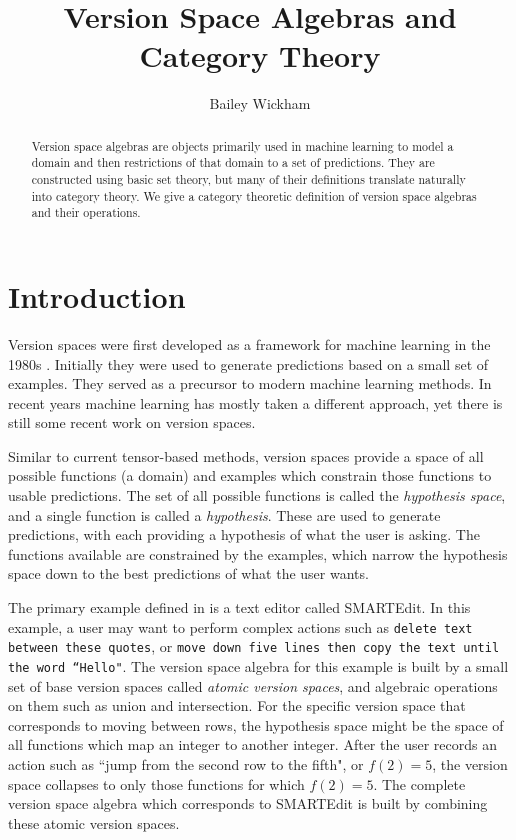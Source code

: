 \documentclass{article}
\title{Version Space Algebras and Category Theory}
\author{Bailey Wickham}
\theoremstyle{definition}
\begin{document}
\maketitle

\begin{abstract}
Version space algebras are objects primarily used in machine learning to model a domain and then restrictions of that domain to a set of predictions. They are constructed using basic set theory, but many of their definitions translate naturally into category theory. We give a category theoretic definition of version space algebras and their operations. 
\end{abstract}

\section{Introduction}
Version spaces were first developed as a framework for machine learning in the 1980s \cite{original}. Initially they were used to generate predictions based on a small set of examples. They served as a precursor to modern machine learning methods. In recent years machine learning has mostly taken a different approach, yet there is still some recent work on version spaces. 

Similar to current tensor-based methods, version spaces provide a space of all possible functions (a domain) and examples which constrain those functions to usable predictions. The set of all possible functions is called the \textit{hypothesis space}, and a single function is called a \textit{hypothesis}. These are used to generate predictions, with each providing a hypothesis of what the user is asking. The functions available are constrained by the examples, which narrow the hypothesis space down to the best predictions of what the user wants.

The primary example defined in \cite{short} is a text editor called SMARTEdit. In this example, a user may want to perform complex actions such as \texttt{delete text between these quotes}, or \texttt{move down five lines then copy the text until the word ``Hello"}. The version space algebra for this example is built by a small set of base version spaces called \textit{atomic version spaces}, and algebraic operations on them such as union and intersection. For the specific version space that corresponds to moving between rows, the hypothesis space might be the space of all functions which map an integer to another integer. After the user records an action such as ``jump from the second row to the fifth", or $f(2) = 5$, the version space collapses to only those functions for which $f(2) = 5$. The complete version space algebra which corresponds to SMARTEdit is built by combining these atomic version spaces.
\end{document}
